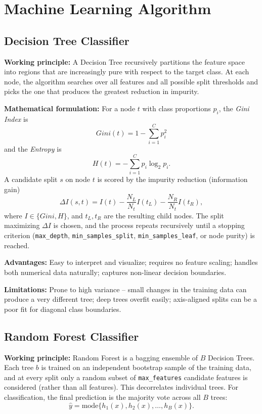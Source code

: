 \documentclass[12pt,a4paper]{article}
\begin{document}
\section{Machine Learning Algorithm}

\subsection*{Decision Tree Classifier}
\textbf{Working principle:} A Decision Tree recursively partitions the feature space into regions
that are increasingly pure with respect to the target class. At each node, the algorithm searches
over all features and all possible split thresholds and picks the one that produces the greatest
reduction in impurity.

\textbf{Mathematical formulation:} For a node $t$ with class proportions $p_i$, the \emph{Gini
Index} is
\[ Gini(t) = 1 - \sum_{i=1}^{C} p_i^2 \]
and the \emph{Entropy} is
\[ H(t) = -\sum_{i=1}^{C} p_i \log_2 p_i. \]
A candidate split $s$ on node $t$ is scored by the impurity reduction (information gain)
\[ \Delta I(s,t) = I(t) - \frac{N_L}{N_t} I(t_L) - \frac{N_R}{N_t} I(t_R), \]
where $I \in \{Gini, H\}$, and $t_L, t_R$ are the resulting child nodes. The split maximizing
$\Delta I$ is chosen, and the process repeats recursively until a stopping criterion
(\texttt{max\_depth}, \texttt{min\_samples\_split}, \texttt{min\_samples\_leaf}, or node purity) is
reached.

\textbf{Advantages:} Easy to interpret and visualize; requires no feature scaling; handles both
numerical data naturally; captures non-linear decision boundaries.

\textbf{Limitations:} Prone to high variance -- small changes in the training data can produce a
very different tree; deep trees overfit easily; axis-aligned splits can be a poor fit for diagonal
class boundaries.

\subsection*{Random Forest Classifier}
\textbf{Working principle:} Random Forest is a bagging ensemble of $B$ Decision Trees. Each tree
$b$ is trained on an independent bootstrap sample of the training data, and at every split only a
random subset of \texttt{max\_features} candidate features is considered (rather than all
features). This decorrelates individual trees. For classification, the final prediction is the
majority vote across all $B$ trees:
\[ \hat{y} = \text{mode}\{ h_1(x), h_2(x), \dots, h_B(x) \}. \]
\end{document}
